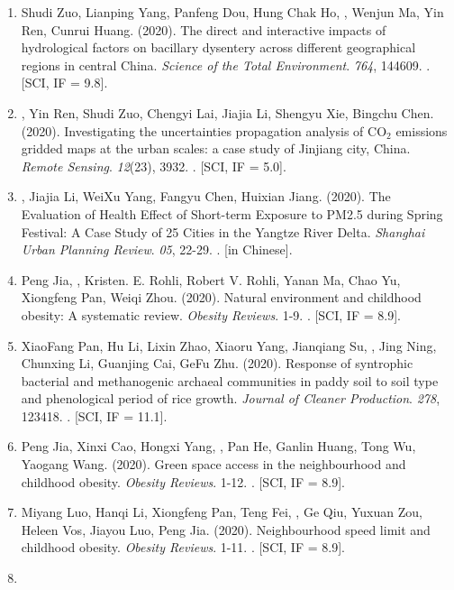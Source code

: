 \begin{enumerate}
\item
    Shudi Zuo, Lianping Yang, Panfeng Dou, Hung Chak Ho, \Shaoqing, Wenjun Ma, Yin Ren, Cunrui Huang. (2020).
    The direct and interactive impacts of hydrological factors on bacillary dysentery across different geographical regions in central China.
    \textit{Science of the Total Environment}. \textit{764}, 144609.
    . [SCI, IF = 9.8].
\item
    \Shaoqing\CF, Yin Ren\CF, Shudi Zuo, Chengyi Lai, Jiajia Li, Shengyu Xie, Bingchu Chen. (2020).
    Investigating the uncertainties propagation analysis of CO$_2$ emissions gridded maps at the urban scales: a case study of Jinjiang city, China. 
    \textit{Remote Sensing}. \textit{12}(23), 3932.
    . [SCI, IF = 5.0].
\item
    \Shaoqing, Jiajia Li, WeiXu Yang, Fangyu Chen, Huixian Jiang. (2020).
    The Evaluation of Health Effect of Short-term Exposure to PM2.5 during Spring Festival: A Case Study of 25 Cities in the Yangtze River Delta.
    \textit{Shanghai Urban Planning Review}. \textit{05}, 22-29.
    . [in Chinese].
\item
    Peng Jia, \Shaoqing, Kristen. E. Rohli, Robert V. Rohli, Yanan Ma, Chao Yu, Xiongfeng Pan, Weiqi Zhou. (2020).
    Natural environment and childhood obesity: A systematic review.
    \textit{Obesity Reviews}. 1-9.
    . [SCI, IF = 8.9].
\item
    XiaoFang Pan, Hu Li, Lixin Zhao, Xiaoru Yang, Jianqiang Su, \Shaoqing, Jing Ning, Chunxing Li, Guanjing Cai, GeFu Zhu. (2020).
    Response of syntrophic bacterial and methanogenic archaeal communities in paddy soil to soil type and phenological period of rice growth.
    \textit{Journal of Cleaner Production}. \textit{278}, 123418.
    . [SCI, IF = 11.1].
\item
    Peng Jia, Xinxi Cao, Hongxi Yang, \Shaoqing, Pan He, Ganlin Huang, Tong Wu, Yaogang Wang. (2020).
    Green space access in the neighbourhood and childhood obesity.
    \textit{Obesity Reviews}. 1-12.
    . [SCI, IF = 8.9].
\item
    Miyang Luo, Hanqi Li, Xiongfeng Pan, Teng Fei, \Shaoqing, Ge Qiu, Yuxuan Zou, Heleen Vos, Jiayou Luo, Peng Jia. (2020).
    Neighbourhood speed limit and childhood obesity.
    \textit{Obesity Reviews}. 1-11.
    . [SCI, IF = 8.9].
\item

\end{enumerate}
